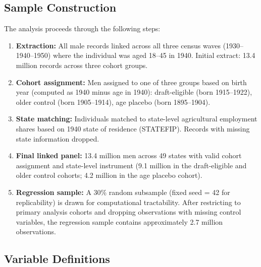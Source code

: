 \documentclass[12pt]{article}
\begin{document}
\subsection{Sample Construction}

The analysis proceeds through the following steps:

\begin{enumerate}
\item \textbf{Extraction:} All male records linked across all three census waves (1930--1940--1950) where the individual was aged 18--45 in 1940. Initial extract: 13.4 million records across three cohort groups.
\item \textbf{Cohort assignment:} Men assigned to one of three groups based on birth year (computed as 1940 minus age in 1940): draft-eligible (born 1915--1922), older control (born 1905--1914), age placebo (born 1895--1904).
\item \textbf{State matching:} Individuals matched to state-level agricultural employment shares based on 1940 state of residence (STATEFIP). Records with missing state information dropped.
\item \textbf{Final linked panel:} 13.4 million men across 49 states with valid cohort assignment and state-level instrument (9.1 million in the draft-eligible and older control cohorts; 4.2 million in the age placebo cohort).
\item \textbf{Regression sample:} A 30\% random subsample (fixed seed = 42 for replicability) is drawn for computational tractability. After restricting to primary analysis cohorts and dropping observations with missing control variables, the regression sample contains approximately 2.7 million observations.
\end{enumerate}

\subsection{Variable Definitions}
\end{document}
